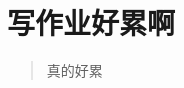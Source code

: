 \documentclass{article}
\title{
\vspace{2in}
\textmd{\textbf{\hmwkClass \  \hmwkTitle}}\\
\Large\vspace{0.1in}\large{\hmwkDueDate}\\
\vspace{2.5in}
}
\author{\textbf{\hmwkAuthorName}}
\date{\hmwkClassTime}
\begin{document}
\maketitle
\thispagestyle{empty}

\newpage
\tableofcontents
\newpage

\section{写作业好累啊}
\begin{quote}
    真的好累
\end{quote}
\end{document}
